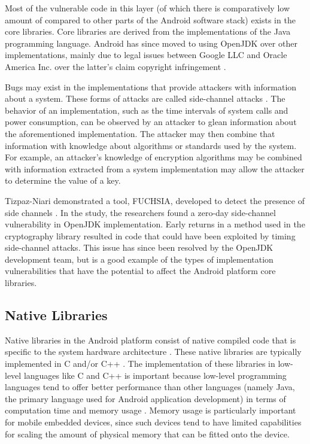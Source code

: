 Most of the vulnerable code in this layer (of which there is comparatively low amount of compared to other parts of the Android software stack) exists in the core libraries.
Core libraries are derived from the implementations of the Java programming language.
Android has since moved to using OpenJDK \cite{OpenJDK2022} over other implementations, mainly due to legal issues between Google LLC and Oracle America Inc. over the latter's claim copyright infringement \cite{Oyez2020, Amadeo2016}.

Bugs may exist in the implementations that provide attackers with information about a system.
These forms of attacks are called side-channel attacks \cite{Tiri2007}.
The behavior of an implementation, such as the time intervals of system calls and power consumption, can be observed by an attacker to glean information about the aforementioned implementation.
The attacker may then combine that information with knowledge about algorithms or standards used by the system.
For example, an attacker's knowledge of encryption algorithms may be combined with information extracted from a system implementation may allow the attacker to determine the value of a key.

Tizpaz-Niari \etal demonstrated a tool, FUCHSIA, developed to detect the presence of side channels \cite{TizpazNiari2018}.
In the study, the researchers found a zero-day side-channel vulnerability in OpenJDK implementation.
Early returns in a method used in the cryptography library resulted in code that could have been exploited by timing side-channel attacks.
This issue has since been resolved by the OpenJDK development team, but is a good example of the types of implementation vulnerabilities that have the potential to affect the Android platform core libraries.

\subsection{Native Libraries}
Native libraries in the Android platform consist of native compiled code that is specific to the system hardware architecture \cite{AndroidDocs2022Arch}.
These native libraries are typically implemented in C \cite{Kernighan1988} and/or C++ \cite{Stroustrup2013}.
The implementation of these libraries in low-level languages like C and C++ is important because low-level programming languages tend to offer better performance than other languages (namely Java, the primary language used for Android application development) in terms of computation time and memory usage \cite{Prechelt2000}.
Memory usage is particularly important for mobile embedded devices, since such devices tend to have limited capabilities for scaling the amount of physical memory that can be fitted onto the device.

